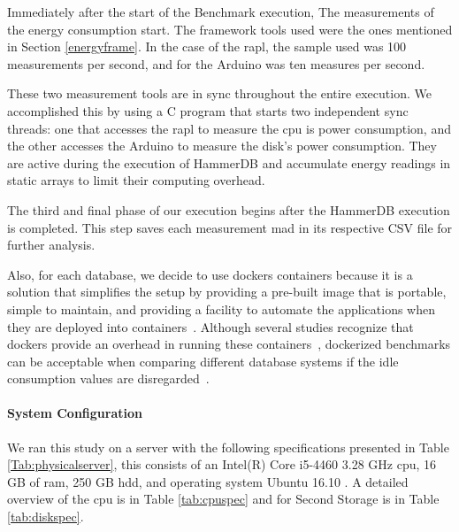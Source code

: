 
Immediately after the start of the Benchmark execution, The measurements of the energy consumption start. The framework tools used were the ones mentioned in Section \ref{energyframe}.  In the case of the \gls{rapl}, the sample used was 100 measurements per second, and for the Arduino was ten measures per second.


These two measurement tools are in sync throughout the entire execution. We accomplished this by using a C program that starts two independent sync threads: one that accesses the \gls{rapl} to measure the \gls{cpu} is power consumption, and the other accesses the Arduino to measure the disk's power consumption. They are active during the execution of HammerDB and accumulate energy readings in static arrays to limit their computing overhead.



The third and final phase of our execution begins after the HammerDB execution is completed. This step saves each measurement mad in its respective CSV file for further analysis.





Also, for each database, we decide to use dockers containers because it is a solution that simplifies the setup by providing a pre-built image that is portable, simple to maintain, and providing a facility to automate the applications when they are deployed into containers~\cite{rad2017introduction,10.1145/2723872.2723882}. Although several studies recognize that dockers provide an overhead in running these containers~\cite{chung2016using,varghese2016container,impactDocker,felter2015updated}, dockerized benchmarks can be acceptable when comparing different database systems if the idle consumption values are disregarded~\cite{grambow2019safe}.


\paragraph{System Configuration}

We ran this study on a server with the following specifications presented in Table  \ref{Tab:physicalserver}, this consists of an Intel(R) Core i5-4460 3.28 GHz \gls{cpu}, 16 GB of \gls{ram}, 250 GB \gls{hdd}, and operating system Ubuntu 16.10 . A detailed overview of the \gls{cpu} is in Table \ref{tab:cpuspec} and for Second Storage is in Table \ref{tab:diskspec}.

